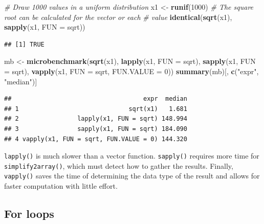 \documentclass[
  12pt,
  american,
  a4paper,
  extrafontsizes,onecolumn,openright
  ]{memoir}
\newenvironment{Shaded}{\begin{snugshade}}{\end{snugshade}}
\newcommand{\AttributeTok}[1]{\textcolor[rgb]{0.13,0.29,0.53}{#1}}
\newcommand{\CommentTok}[1]{\textcolor[rgb]{0.56,0.35,0.01}{\textit{#1}}}
\newcommand{\DecValTok}[1]{\textcolor[rgb]{0.00,0.00,0.81}{#1}}
\newcommand{\FunctionTok}[1]{\textcolor[rgb]{0.13,0.29,0.53}{\textbf{#1}}}
\newcommand{\NormalTok}[1]{#1}
\newcommand{\OtherTok}[1]{\textcolor[rgb]{0.56,0.35,0.01}{#1}}
\newcommand{\StringTok}[1]{\textcolor[rgb]{0.31,0.60,0.02}{#1}}
\begin{document}
\begin{Shaded}
\begin{Highlighting}[]
\CommentTok{\# Draw 1000 values in a uniform distribution}
\NormalTok{x1 }\OtherTok{\textless{}{-}} \FunctionTok{runif}\NormalTok{(}\DecValTok{1000}\NormalTok{)}
\CommentTok{\# The square root can be calculated for the vector or each}
\CommentTok{\# value}
\FunctionTok{identical}\NormalTok{(}\FunctionTok{sqrt}\NormalTok{(x1), }\FunctionTok{sapply}\NormalTok{(x1, }\AttributeTok{FUN =}\NormalTok{ sqrt))}
\end{Highlighting}
\end{Shaded}

\begin{verbatim}
## [1] TRUE
\end{verbatim}

\begin{Shaded}
\begin{Highlighting}[]
\NormalTok{mb }\OtherTok{\textless{}{-}} \FunctionTok{microbenchmark}\NormalTok{(}\FunctionTok{sqrt}\NormalTok{(x1), }\FunctionTok{lapply}\NormalTok{(x1, }\AttributeTok{FUN =}\NormalTok{ sqrt), }\FunctionTok{sapply}\NormalTok{(x1,}
    \AttributeTok{FUN =}\NormalTok{ sqrt), }\FunctionTok{vapply}\NormalTok{(x1, }\AttributeTok{FUN =}\NormalTok{ sqrt, }\AttributeTok{FUN.VALUE =} \DecValTok{0}\NormalTok{))}
\FunctionTok{summary}\NormalTok{(mb)[, }\FunctionTok{c}\NormalTok{(}\StringTok{"expr"}\NormalTok{, }\StringTok{"median"}\NormalTok{)]}
\end{Highlighting}
\end{Shaded}

\begin{verbatim}
##                                    expr  median
## 1                              sqrt(x1)   1.681
## 2                lapply(x1, FUN = sqrt) 148.994
## 3                sapply(x1, FUN = sqrt) 184.090
## 4 vapply(x1, FUN = sqrt, FUN.VALUE = 0) 144.320
\end{verbatim}

\normalsize

\texttt{lapply()} is much slower than a vector function.
\texttt{sapply()} requires more time for \texttt{simplify2array()}, which must detect how to gather the results.
Finally, \texttt{vapply()} saves the time of determining the data type of the result and allows for faster computation with little effort.

\subsection{For loops}\label{for-loops}
\end{document}
